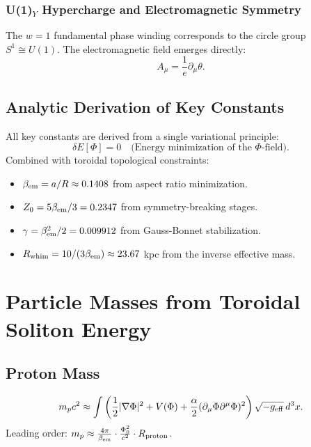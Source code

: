 \documentclass[12pt, a4paper]{article}
\begin{document}
\subsubsection{U(1)$_Y$ Hypercharge and Electromagnetic Symmetry}
The $w=1$ fundamental phase winding corresponds to the circle group $S^1 \cong U(1)$. The electromagnetic field emerges directly:
\begin{equation}
A_{\mu} = \frac{1}{e} \partial_{\mu} \theta.
\end{equation}

\subsection{Analytic Derivation of Key Constants}
All key constants are derived from a single variational principle:
\begin{equation}
\delta E[\Phi] = 0 \quad \text{(Energy minimization of the $\Phi$-field)}.
\end{equation}
Combined with toroidal topological constraints:
\begin{itemize}
    \item $\beta_{\rm em} = a/R \approx 0.1408$ from aspect ratio minimization.
    \item $Z_0 = 5\beta_{\rm em}/3 = 0.2347$ from symmetry-breaking stages.
    \item $\gamma = \beta_{\rm em}^2/2 = 0.009912$ from Gauss-Bonnet stabilization.
    \item $R_{\rm whim} = 10/(3\beta_{\rm em}) \approx 23.67$ kpc from the inverse effective mass.
\end{itemize}

\section{Particle Masses from Toroidal Soliton Energy}
\label{sec:masses}

\subsection{Proton Mass}
\begin{equation}
m_p c^2 \approx \int \left( \frac{1}{2} |\nabla \Phi|^2 + V(\Phi) + \frac{\alpha}{2} (\partial_\mu \Phi \partial^\mu \Phi)^2 \right) \sqrt{-g_{\rm eff}} \, d^3x.
\end{equation}
Leading order: $m_p \approx \frac{4\pi}{\beta_{\rm em}} \cdot \frac{\Phi_0^2}{c^2} \cdot R_{\rm proton}$.
\end{document}
